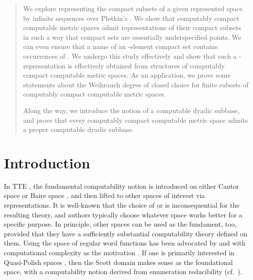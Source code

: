 \documentclass{eptcs-modified}
\begin{document}
\newcommand\tboldsymbol[1]{\protect\raisebox{0pt}[0pt][0pt]{}\mbox{\hskip 1pt}}

\newcommand{\bolds}{\tboldsymbol{\Sigma}}
\newcommand{\boldp}{\tboldsymbol{\Pi}}
\newcommand{\boldd}{\tboldsymbol{\Delta}}
\newcommand{\boldg}{\tboldsymbol{\Gamma}}

\newcommand{\seti}{\setcounter{saveenumi}{\value{enumi}}}
\newcommand{\conti}{\setcounter{enumi}{\value{saveenumi}}}



\maketitle

\begin{abstract}    We explore representing the compact subsets of a given represented space by infinite sequences over Plotkin's . We show that computably compact computable metric spaces admit
representations of their compact subsets
in such a way that compact sets are essentially underspecified points.
We can even ensure that a name of an -element compact set contains  occurrences of .
We undergo this study effectively  and show that
such a -representation is effectively obtained from structures of
computably compact computable metric spaces.
As an application, we prove some statements about the Weihrauch degree of closed choice for finite subsets of computably compact computable metric spaces.

Along the way, we introduce the notion of a computable dyadic subbase, and prove that every computably compact computable metric space admits a proper computable dyadic subbase.
\end{abstract}

\maketitle








\section{Introduction}
In TTE \cite{weihrauchd}, the fundamental computability notion is introduced on either Cantor space  or Baire space , and then lifted to other spaces of interest via representations. It is well-known that the choice of  or  is inconsequential for the resulting theory, and authors typically choose whatever space works better for a specific purpose. In principle, other spaces can be used as the fundament, too, provided that they have a sufficiently substantial computability theory defined on them. Using the space of regular word functions has been advocated by  and  with computational complexity as the motivation \cite{kawamura}. If one is primarily interested in Quasi-Polish spaces \cite{debrecht6}, then the Scott domain  makes sense as the foundational space, with a computability notion derived from enumeration reducibility (cf.~\cite{pauly-kihara-arxiv}).
\end{document}
